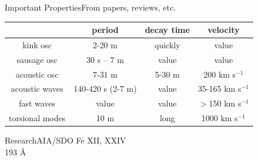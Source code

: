 \documentclass[11pt,table]{beamer}
\begin{document}
\begin{frame}{Important Properties}{From papers, reviews, etc.}
\begin{center}
    \begin{tabular}{c|c|c|c|}
        \cline{2-4} & {\textbf{\textcolor{gsa}{period}}} &
        {\textbf{\textcolor{gsa}{decay time}}} &
        {\textbf{\textcolor{gsa}{velocity}}}\\
        \hline \multicolumn{0}{|c|}{\textcolor{cblue}{kink osc}} &
            2{-}20 m & quickly & value\\
        \hline \multicolumn{0}{|c|}{\textcolor{cblue}{sausage osc}} &
            30 s -- 7 m & value & value\\
        \hline \multicolumn{0}{|c|}{\textcolor{cblue}{acoustic osc}} &
            7{-}31 m & 5{-}30 m & 200 km s$^{-1}$\\
        \hline \multicolumn{0}{|c|}{\textcolor{cblue}{acoustic waves}} &
        140{-}420 s (2{-}7 m) & value & 35{-}165 km s$^{-1}$\\
        \hline \multicolumn{0}{|c|}{\textcolor{cblue}{fast waves}} &
            value & value & $>$150 km s$^{-1}$\\
        \hline \multicolumn{0}{|c|}{\textcolor{cblue}{torsional modes}} &
            10 m & long & 1000 km s$^{-1}$\\
        \hline
    \end{tabular}
\end{center}
\end{frame}%
{%
\begin{frame}[t]{Research}{AIA/SDO}
    \hspace{-2em}Fe {\footnotesize XII, XXIV}\\
    \hspace{-2em}193 \AA{}\\
\end{frame}}%
%
\end{document}
